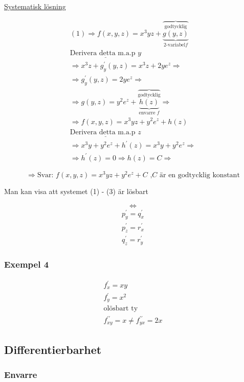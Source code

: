 \documentclass{article}
\begin{document}
\underline{Systematisk lösning}

\[
\begin{split}
	(1) \Rightarrow f(x,y,z) = x^3yz+\overbrace{\underbrace{g(y,z)}^{\text{godtycklig}}_{\text{2-variabel} f}} \\
	\underline{\text{Derivera detta m.a.p } y} \\
	\Rightarrow x^3z+g_{y}^{\prime}(y,z) = x^3z+2ye^z \Rightarrow \\
	\Rightarrow g_{y}^{\prime}(y,z) = 2ye^z \Rightarrow \\
	\Rightarrow g(y,z) = y^2e^z + \overbrace{\underbrace{h(z)}^{\text{godtycklig}}_{\text{envarre }f}} \Rightarrow \\
	\Rightarrow f(x,y,z) = x^3yz+y^2e^z+h(z) \\
	\underline{\text{Derivera detta m.a.p } z} \\
	\Rightarrow x^3y+y^2e^z+h^{\prime}(z) = x^3y+y^2e^z \Rightarrow \\
	\Rightarrow h^{\prime}(z) = 0 \Rightarrow h(z) = C \Rightarrow
\end{split}
\]

\[
	\Rightarrow \text{Svar: } f(x,y,z) = x^3yz+y^2e^z+C \text{ ,\(C\) är en godtycklig konstant}
\]

\centerline{Man kan visa att systemet (1) - (3) är lösbart}
\[
	\iff
\]
\[
\begin{split}
	p_{y}^{\prime} = q_{x}^{\prime} \\
	p_{z}^{\prime} = r_{x}^{\prime} \\
	q_{z}^{\prime} = r_{y}^{\prime} 
\end{split}
\]

\subsubsection{Exempel 4}

\[
\begin{split}
	f_{x}^{\prime} = xy \\
	f_{y}^{\prime} = x^2 \\
	\text{olösbart ty} \\
	f_{xy}^{\prime\prime} = x \neq f_{yx}^{\prime\prime} = 2x
\end{split}
\]

\subsection{Differentierbarhet}
\subsubsection*{Envarre}
\end{document}
